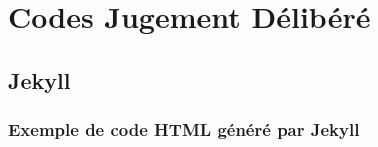\chapter*{Codes Jugement Délibéré}

\makeatletter
\renewcommand{\thesection}{\@arabic\c@section}
\makeatother



\section{Jekyll}

\subsection{Exemple de code HTML généré par Jekyll}
\label{sec:shtml}


\vspace{1cm}

